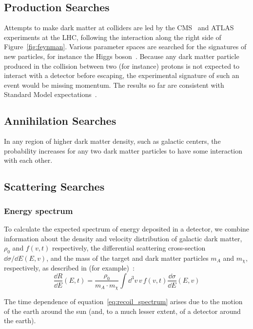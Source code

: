 \subsection{Production Searches}

Attempts to make dark matter at colliders are led by the CMS~\cite{cms:2008} and ATLAS~\cite{atlas:2008} experiments at the LHC, following the interaction along the right side of Figure~\ref{fig:feynman}. Various parameter spaces are searched for the signatures of new particles, for instance the Higgs boson~\cite{cms:2012,atlas:2012}. Because any dark matter particle produced in the collision between two (for instance) protons is not expected to interact with a detector before escaping, the experimental signature of such an event would be missing momentum. The results so far are consistent with Standard Model expectations~\cite{atlas:2016,cms:2017}.

\subsection{Annihilation Searches}

In any region of higher dark matter density, such as galactic centers, the probability increases for any two dark matter particles to have some interaction with each other.

\subsection{Scattering Searches}

\subsubsection{Energy spectrum}

To calculate the expected spectrum of energy deposited in a detector, we combine information about the density and velocity distribution of galactic dark matter, $\rho_0$ and $f(v,t)$ respectively, the differential scattering cross-section $\dd\sigma/\dd E(E,v)$, and the mass of the target and dark matter particles $m_A$ and $m_{\chi}$, respectively, as described in (for example)~\cite{Undagoitia:2015gya,Lewin:1996}:
\begin{equation}\label{eq:recoil_spectrum}
\frac{\dd R}{\dd E}(E,t) = \frac{\rho_0}{m_A \cdot m_{\chi}} \int\dd^3v\,v\,f(v,t)\frac{\dd\sigma}{\dd E}(E,v)
\end{equation}

The time dependence of equation~\eqref{eq:recoil_spectrum} arises due to the motion of the earth around the sun (and, to a much lesser extent, of a detector around the earth).

